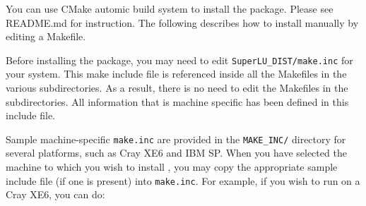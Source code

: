 You can use CMake automic build system to install the package. Please see
README.md for instruction. The following describes how to install manually
by editing a Makefile.

Before installing the package, you may need to edit
{\tt SuperLU\_DIST/make.inc} for your system.
This make include file is referenced inside all the Makefiles
in the various subdirectories. As a result, there is no need to 
edit the Makefiles in the subdirectories. All information that is
machine specific has been defined in this include file. 

Sample machine-specific {\tt make.inc} are provided in the
{\tt MAKE\_INC/} directory for several platforms, such as
Cray XE6 and IBM SP.
When you have selected the machine to which you wish to install
{\superlud}, you may copy the appropriate sample include file
(if one is present) into {\tt make.inc}. For example, if you wish to run
on a Cray XE6,  you can do:

\hspace{.4in}{\tt cp MAKE\_INC/make.xe6 make.inc}

